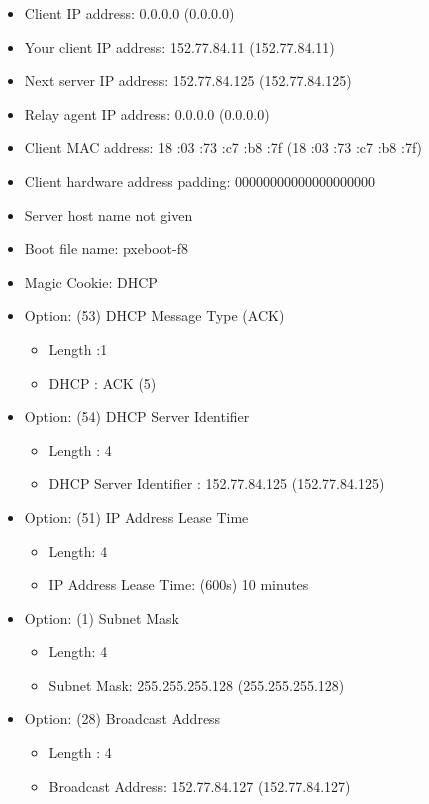\documentclass{article}
\begin{document}
\begin{itemize}\renewcommand{\labelitemi}{$\bullet$}
	\item  Client IP address: 0.0.0.0 (0.0.0.0)
	\item  Your client IP address: 152.77.84.11 (152.77.84.11)
	\item  Next server IP address: 152.77.84.125 (152.77.84.125)
	\item  Relay agent IP address: 0.0.0.0 (0.0.0.0)
	\item  Client MAC address: 18 :03 :73 :c7 :b8 :7f (18 :03 :73 :c7 :b8 :7f)
	\item Client hardware address padding: 00000000000000000000
	\item  Server host name not given
	\item  Boot file name: pxeboot-f8
	\item  Magic Cookie: DHCP
	\item  Option: (53) DHCP Message Type (ACK)
	\begin{itemize}
		\item Length :1
		\item DHCP : ACK (5)
	\end{itemize}
	\item  Option: (54) DHCP Server Identifier
	\begin{itemize}
		\item Length : 4
		\item DHCP Server Identifier : 152.77.84.125 (152.77.84.125)
	\end{itemize}
	\item  Option: (51) IP Address Lease Time
	\begin{itemize}
		\item Length: 4
		\item IP Address Lease Time: (600s) 10 minutes
	\end{itemize}
	\item  Option: (1) Subnet Mask
	\begin{itemize}
		\item Length: 4
		\item Subnet Mask: 255.255.255.128 (255.255.255.128)
	\end{itemize}
	\item  Option: (28) Broadcast Address
	\begin{itemize}
		\item Length : 4
		\item Broadcast Address: 152.77.84.127 (152.77.84.127)
	\end{itemize}

\end{itemize}
\end{document}
